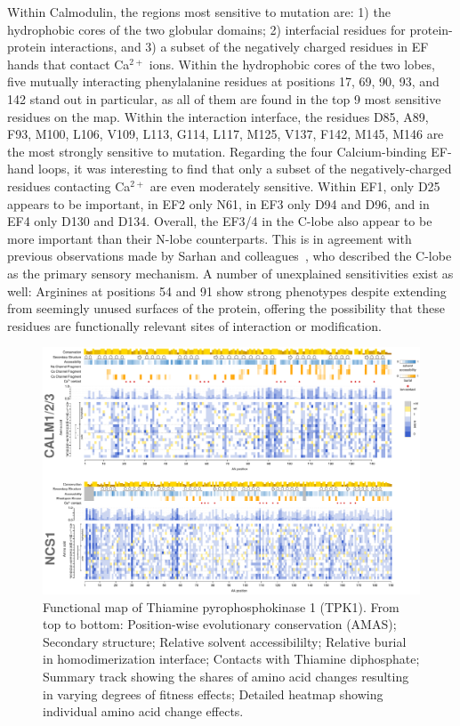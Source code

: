 Within Calmodulin, the regions most sensitive to mutation are: 1) the hydrophobic cores of the two globular domains; 2) interfacial residues for protein-protein interactions, and 3) a subset of the negatively charged residues in EF hands that contact Ca$^{2+}$ ions. Within the hydrophobic cores of the two lobes, five mutually interacting phenylalanine residues at positions 17, 69, 90, 93, and 142 stand out in particular, as all of them are found in the top 9 most sensitive residues on the map. Within the interaction interface, the residues D85, A89, F93, M100, L106, V109, L113, G114, L117, M125, V137, F142, M145, M146 are the most strongly sensitive to mutation. Regarding the four Calcium-binding EF-hand loops, it was interesting to find that only a subset of the negatively-charged residues contacting Ca$^{2+}$ are even moderately sensitive. Within EF1, only D25 appears to be important, in EF2 only N61, in EF3 only D94 and D96, and in EF4 only D130 and D134. Overall, the EF3/4 in the C-lobe also appear to be more important than their N-lobe counterparts. This is in agreement with previous observations made by Sarhan and colleagues~\cite{sarhan_crystallographic_2012}, who described the C-lobe as the primary sensory mechanism. A number of unexplained sensitivities exist as well: Arginines at positions 54 and 91 show strong phenotypes despite extending from seemingly unused surfaces of the protein, offering the possibility that these residues are functionally relevant sites of interaction or modification.


\begin{landscape}
\begin{figure}[h!]
	\centering
	\includegraphics[width=9in]{img/calm+ncs1-maps.pdf}
	\caption{Functional map of Thiamine pyrophosphokinase 1 (TPK1). From top to bottom: Position-wise evolutionary conservation (AMAS); Secondary structure; Relative solvent accessibililty; Relative burial in homodimerization interface; Contacts with Thiamine diphosphate; Summary track showing the shares of amino acid changes resulting in varying degrees of fitness effects; Detailed heatmap showing individual amino acid change effects.}
	\label{fig:calm+ncs1-maps}
\end{figure}
\end{landscape}


